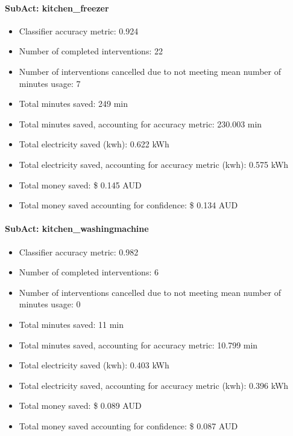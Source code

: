 \documentclass[11pt,]{article}
\providecommand{\tightlist}{%
  \setlength{\itemsep}{0pt}\setlength{\parskip}{0pt}}
\let\oldparagraph\paragraph
\renewcommand{\paragraph}[1]{\oldparagraph{#1}\mbox{}}
\begin{document}
\hypertarget{subact-kitchen_freezer}{%
\paragraph{SubAct: kitchen\_freezer}\label{subact-kitchen_freezer}}

\begin{itemize}
\tightlist
\item
  Classifier accuracy metric: 0.924
\item
  Number of completed interventions: 22
\item
  Number of interventions cancelled due to not meeting mean number of
  minutes usage: 7
\item
  Total minutes saved: 249 min
\item
  Total minutes saved, accounting for accuracy metric: 230.003 min
\item
  Total electricity saved (kwh): 0.622 kWh
\item
  Total electricity saved, accounting for accuracy metric (kwh): 0.575
  kWh
\item
  Total money saved: \$ 0.145 AUD
\item
  Total money saved accounting for confidence: \$ 0.134 AUD
\end{itemize}

\hypertarget{subact-kitchen_washingmachine}{%
\paragraph{SubAct:
kitchen\_washingmachine}\label{subact-kitchen_washingmachine}}

\begin{itemize}
\tightlist
\item
  Classifier accuracy metric: 0.982
\item
  Number of completed interventions: 6
\item
  Number of interventions cancelled due to not meeting mean number of
  minutes usage: 0
\item
  Total minutes saved: 11 min
\item
  Total minutes saved, accounting for accuracy metric: 10.799 min
\item
  Total electricity saved (kwh): 0.403 kWh
\item
  Total electricity saved, accounting for accuracy metric (kwh): 0.396
  kWh
\item
  Total money saved: \$ 0.089 AUD
\item
  Total money saved accounting for confidence: \$ 0.087 AUD
\end{itemize}
\end{document}

